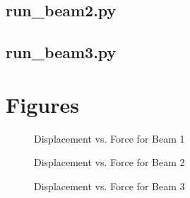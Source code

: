 \documentclass{article}
\begin{document}
\subsection{run\_beam2.py}
%
\pagebreak  %
\subsection{run\_beam3.py}
%
\pagebreak  %
\section{Figures}
\begin{figure}[htb]
\begin{center}
\caption{Displacement vs. Force for Beam 1}
\end{center}
\end{figure}

\begin{figure}[h!tb]
\begin{center}
\caption{Displacement vs. Force for Beam 2}
\end{center}
\end{figure}

\begin{figure}[h!tb]
\begin{center}
\caption{Displacement vs. Force for Beam 3}
\end{center}
\end{figure}
\end{document}
